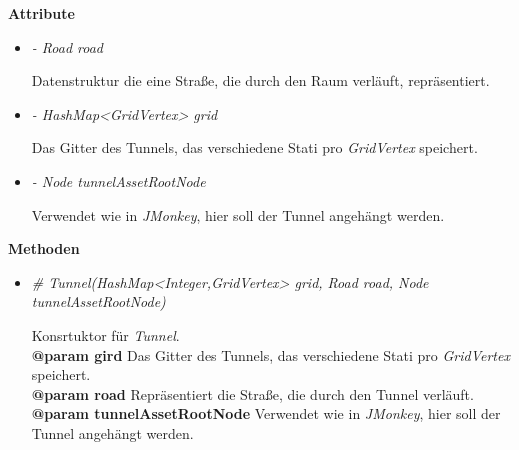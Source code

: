             \textbf{Attribute}
            \begin{itemize}
                \item  \textit{- Road road} 
                    \begin{leftbar}[0.9\linewidth]
                        Datenstruktur die eine Straße, die durch den Raum verläuft, repräsentiert.
                    \end{leftbar}
                
                \item  \textit{- HashMap<GridVertex> grid} 
                    \begin{leftbar}[0.9\linewidth]
                        Das Gitter des Tunnels, das verschiedene Stati pro \textit{GridVertex} speichert.
                    \end{leftbar}
                
                \item  \textit{- Node tunnelAssetRootNode} 
                    \begin{leftbar}[0.9\linewidth]
                        Verwendet wie in \textit{JMonkey}, hier soll der Tunnel angehängt werden.
                    \end{leftbar}
            \end{itemize}

            \textbf{Methoden}					
            \begin{itemize}
                \item  \textit{\# Tunnel(HashMap<Integer,GridVertex> grid, Road road, Node tunnelAssetRootNode)}
                    \begin{leftbar}[0.9\linewidth]
                        Konsrtuktor für \textit{Tunnel}.\\
                        \textbf{@param gird} Das Gitter des Tunnels, das verschiedene Stati pro \textit{GridVertex} speichert.\\
                        \textbf{@param road} Repräsentiert die Straße, die durch den Tunnel verläuft.\\
                        \textbf{@param tunnelAssetRootNode} Verwendet wie in \textit{JMonkey}, hier soll der Tunnel angehängt werden.
                    \end{leftbar}   
            \end{itemize}



